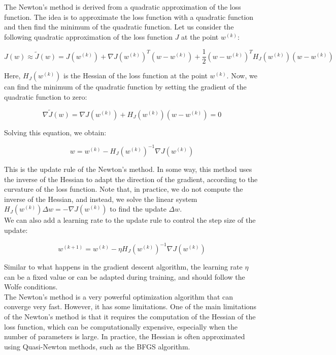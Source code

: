 The Newton's method is derived from a quadratic approximation of the loss function. The idea is to
approximate the loss function with a quadratic function and then find the minimum of the quadratic
function. Let us consider the following quadratic approximation of the loss function $J$ at the point
$w^{(k)}$:

\begin{equation}
    J(w) \approx \tilde{J}(w) = J(w^{(k)}) + \nabla J(w^{(k)})^T (w - w^{(k)}) + \frac{1}{2} (w - w^{(k)})^T H_J(w^{(k)}) (w - w^{(k)})
\end{equation}

Here, $H_J(w^{(k)})$ is the Hessian of the loss function at the point $w^{(k)}$. Now, we can find the
minimum of the quadratic function by setting the gradient of the quadratic function to zero:

$$\nabla \tilde{J}(w) = \nabla J(w^{(k)}) + H_J(w^{(k)}) (w - w^{(k)}) = 0$$

Solving this equation, we obtain:

\begin{equation}
    w = w^{(k)} - H_J(w^{(k)})^{-1} \nabla J(w^{(k)})
\end{equation}

This is the update rule of the Newton's method. In some way, this method uses the inverse of the
Hessian to adapt the direction of the gradient, according to the curvature of the loss function. 
Note that, in practice, we do not compute the inverse of the Hessian, and instead, we solve the
linear system $H_J(w^{(k)}) \Delta w = - \nabla J(w^{(k)})$ to find the update $\Delta w$.\\

We can also add a learning rate to the update rule to control the step size of the update:

\begin{equation}
    w^{(k+1)} = w^{(k)} - \eta H_J(w^{(k)})^{-1} \nabla J(w^{(k)})
\end{equation}

Similar to what happens in the gradient descent algorithm, the learning rate $\eta$ can be a fixed
value or can be adapted during training, and should follow the Wolfe conditions.\\ 

The Newton's method is a very powerful optimization algorithm that can converge very fast. However,
it has some limitations. One of the main limitations of the Newton's method is that it requires the
computation of the Hessian of the loss function, which can be computationally expensive, especially
when the number of parameters is large. In practice, the Hessian is often approximated using 
Quasi-Newton methods, such as the BFGS algorithm.


